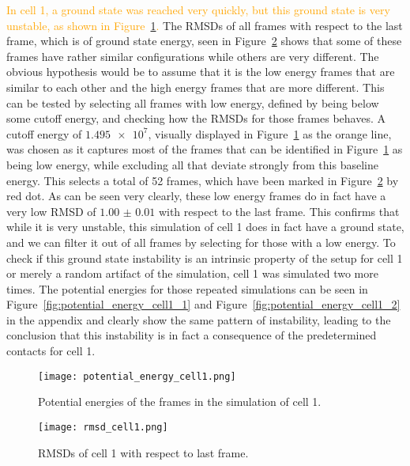 \textcolor{orange}{In cell 1, a ground state was reached very quickly, but this ground state is very unstable, as shown in Figure~\ref{fig:potential_energy_cell1}.} The RMSDs of all frames with respect to the last frame, which is of ground state energy, seen in Figure~\ref{fig:rmsd_cell1} shows that some of these frames have rather similar configurations while others are very different. The obvious hypothesis would be to assume that it is the low energy frames that are similar to each other and the high energy frames that are more different. This can be tested by selecting all frames with low energy, defined by being below some cutoff energy, and checking how the RMSDs for those frames behaves. A cutoff energy of \(\num{1.495e7}\), visually displayed in Figure~\ref{fig:potential_energy_cell1} as the orange line, was chosen as it captures most of the frames that can be identified in Figure~\ref{fig:potential_energy_cell1} as being low energy, while excluding all that deviate strongly from this baseline energy. This selects a total of 52 frames, which have been marked in Figure~\ref{fig:rmsd_cell1} by red dot. As can be seen very clearly, these low energy frames do in fact have a very low RMSD of \(\num{1.00(1)}\) with respect to the last frame. This confirms that while it is very unstable, this simulation of cell 1 does in fact have a ground state, and we can filter it out of all frames by selecting for those with a low energy. To check if this ground state instability is an intrinsic property of the setup for cell 1 or merely a random artifact of the simulation, cell 1 was simulated two more times. The potential energies for those repeated simulations can be seen in Figure~\ref{fig:potential_energy_cell1_1} and Figure~\ref{fig:potential_energy_cell1_2} in the appendix and clearly show the same pattern of instability, leading to the conclusion that this instability is in fact a consequence of the predetermined contacts for cell 1.

\begin{figure}[ht]
\centering
  \texttt{[image: potential\_energy\_cell1.png]}
  \caption{Potential energies of the frames in the simulation of cell 1.}
  \label{fig:potential_energy_cell1}
\end{figure}

\begin{figure}[ht]
\centering
  \texttt{[image: rmsd\_cell1.png]}
  \caption{RMSDs of cell 1 with respect to last frame.}
  \label{fig:rmsd_cell1}
\end{figure}

